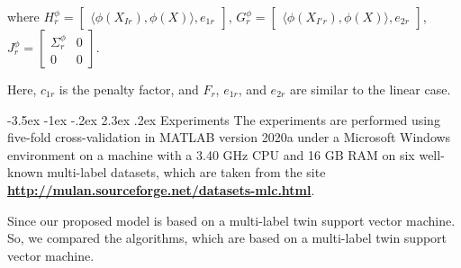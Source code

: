 \documentclass[12pt,a4paper,oneside,english]{report}
\makeatletter
\renewcommand\section{\@startsection {section}{1}{\z@}%
                                   {-3.5ex \@plus -1ex \@minus -.2ex}%
                                   {2.3ex \@plus.2ex}%
                                   {\centering\normalfont\LARGE\bfseries}}
\makeatother
\begin{document}
where $H_r^{\phi} = \begin{bmatrix} \langle \phi(X_{Ir}), \phi(X) \rangle, e_{1r} \end{bmatrix}$, 
$G_r^{\phi} = \begin{bmatrix} \langle \phi(X_{I'r}), \phi(X) \rangle, e_{2r} \end{bmatrix}$, 
$J_r^{\phi} = 
\begin{bmatrix}
\Sigma_r^{\phi} & 0 \\
0 & 0
\end{bmatrix}$.

Here, $c_{1r}$ is the penalty factor, and $F_r$, $e_{1r}$, and $e_{2r}$ are similar to the linear case.


\section{Experiments}
\label{Experiments}
The experiments are performed using five-fold cross-validation in MATLAB version 2020a under a Microsoft Windows environment on a machine with a 3.40 GHz CPU and 16 GB RAM on six well-known multi-label datasets, which are taken from the site \textbf{\url{http://mulan.sourceforge.net/datasets-mlc.html}}.


Since our proposed model is based on a multi-label twin support vector machine. So, we compared the algorithms, which are based on a multi-label twin support vector machine.
\end{document}
